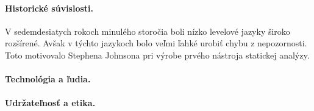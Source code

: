 \documentclass[10pt,twoside,slovak,a4paper]{article}
\begin{document}
\paragraph{Historické súvislosti.}
V sedemdesiatych rokoch minulého storočia boli nízko levelové jazyky široko rozšírené. Avšak v týchto jazykoch
bolo veľmi ľahké urobiť chybu z nepozornosti. Toto motivovalo Stephena Johnsona pri výrobe prvého nástroja statickej analýzy.

\paragraph{Technológia a ľudia.}

\paragraph{Udržateľnosť a etika.}
\end{document}
